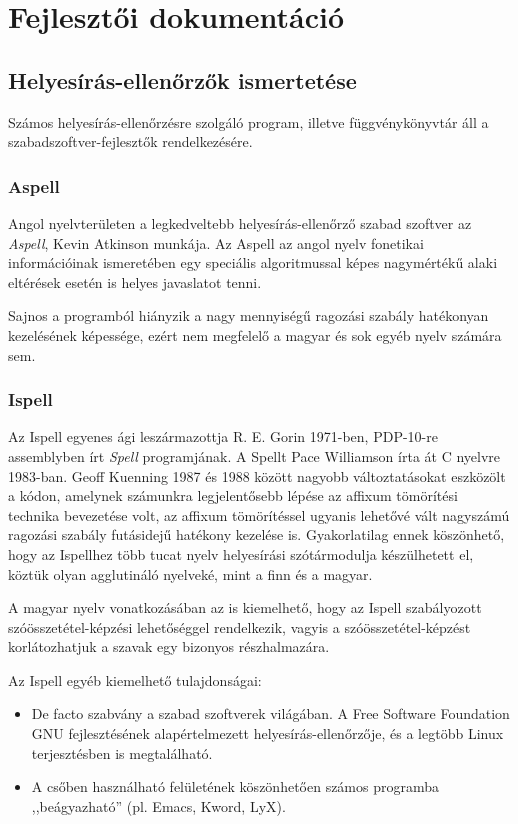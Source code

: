 
\chapter{Fejlesztői dokumentáció}

\section{Helyesírás-ellenőrzők ismertetése}

Számos helyesírás-ellenőrzésre szolgáló program,
illetve függvénykönyvtár áll a szabadszoftver-fejlesztők
rendelkezésére.

\subsection{Aspell}

Angol nyelvterületen a legkedveltebb helyesírás-ellenőrző
szabad szoftver az \emph{Aspell}, Kevin Atkinson munkája. Az Aspell
az angol nyelv fonetikai információinak
ismeretében egy speciális algoritmussal képes nagymértékű
alaki eltérések esetén is helyes javaslatot tenni.

Sajnos a programból hiányzik a nagy mennyiségű ragozási
szabály hatékonyan kezelésének képessége,
ezért nem megfelelő a magyar
és sok egyéb nyelv számára sem.

\subsection{Ispell}

Az Ispell egyenes ági leszármazottja  R. E. Gorin 1971-ben,
PDP-10-re assemblyben írt \emph{Spell} programjának.
A Spellt Pace Williamson írta át C nyelvre 1983-ban.
Geoff Kuenning 1987 és 1988 között nagyobb változtatásokat
eszközölt a kódon, amelynek számunkra legjelentősebb
lépése az affixum tömörítési technika bevezetése volt,
az affixum tömörítéssel ugyanis lehetővé vált
nagyszámú ragozási szabály futásidejű hatékony
kezelése is. Gyakorlatilag ennek köszönhető,
hogy az Ispellhez több tucat nyelv helyesírási szótármodulja
készülhetett el, köztük olyan agglutináló nyelveké, mint a finn
és a magyar.

A magyar nyelv vonatkozásában az is
kiemelhető, hogy az Ispell szabályozott szóösszetétel-képzési lehetőséggel
rendelkezik, vagyis a szóösszetétel-képzést korlátozhatjuk
a szavak egy bizonyos részhalmazára.

Az Ispell egyéb kiemelhető tulajdonságai:

\begin{itemize}
\item De facto szabvány a szabad szoftverek világában. 
A Free Software Foundation GNU fejlesztésének alapértelmezett
helyesírás-ellenőrzője, és a legtöbb Linux
terjesztésben is megtalálható.

\item A csőben használható felületének köszönhetően számos
programba ,,beágyazható'' (pl. Emacs, Kword, LyX).
\end{itemize}

